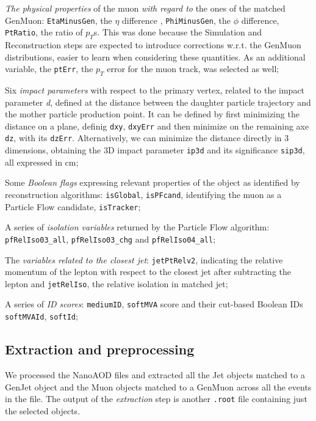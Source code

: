 \begin{outline}
\1 \emph{The physical properties} of the muon \emph{with regard to} the ones of the matched GenMuon: \texttt{EtaMinusGen}, the $\eta$ difference , \texttt{PhiMinusGen}, the $\phi$ difference, \texttt{PtRatio}, the ratio of $p_T$s. This was done because the Simulation and Reconstruction steps are expected to introduce corrections w.r.t. the GenMuon distributions, easier to learn when considering these quantities. As an additional variable, the \texttt{ptErr}, the $p_T$ error for the muon track, was selected as well;

\1 Six \emph{impact parameters} with respect to the primary vertex, related to the impact parameter \emph{d}, defined at the distance between the daughter particle trajectory and the mother particle production point. It can be defined by first minimizing the distance on a plane, definig \texttt{dxy}, \texttt{dxyErr} and then minimize on the remaining axe \texttt{dz}, with its \texttt{dzErr}. Alternatively, we can minimize the distance directly in 3 dimensions, obtaining the 3D impact parameter \texttt{ip3d} and its significance \texttt{sip3d}, all expressed in cm;

\1 Some \emph{Boolean flags} expressing relevant properties of the object as identified by reconstruction algorithms: \texttt{isGlobal}, \texttt{isPFcand}, identifying the muon as a Particle Flow candidate, \texttt{isTracker};

\1 A series of \emph{isolation variables} returned by the Particle Flow algorithm: \texttt{pfRelIso03\_all}, \texttt{pfRelIso03\_chg} and \texttt{pfRelIso04\_all};

\1 The \emph{variables related to the closest jet}: \texttt{jetPtRelv2}, indicating the relative momentum of the lepton with respect to the closest jet after subtracting the lepton and \texttt{jetRelIso}, the relative isolation in matched jet;

\1 A series of \emph{ID scores}: \texttt{mediumID}, \texttt{softMVA} score and their cut-based Boolean IDs \texttt{softMVAId}, \texttt{softId};
\end{outline}

\subsection{Extraction and preprocessing}

We processed the NanoAOD files and extracted all the Jet objects matched to a GenJet object and the Muon objects matched to a GenMuon across all the events in the file.
The output of the \emph{extraction} step is another \texttt{.root} file containing just the selected objects.

